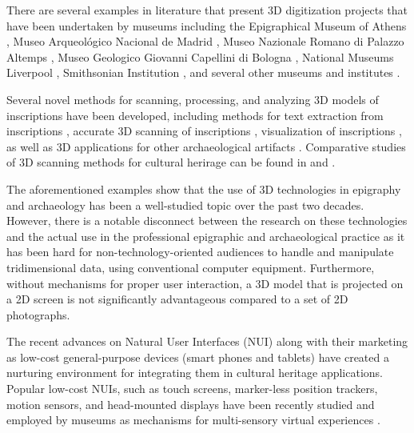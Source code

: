\documentclass[amsthm,ebook]{saparticle}
\begin{document}
There are several examples in literature that present 3D digitization projects that have been undertaken by museums
including the Epigraphical Museum of Athens \citep{sullivan_analytical_2011, papadaki_accurate_2015}, Museo Arqueológico Nacional de
Madrid \citep{ramirez-sanchez_epigrafidigital:_2014}, Museo Nazionale Romano di Palazzo Altemps \citep{barmpoutis_interactive_2015}, Museo
Geologico Giovanni Capellini di Bologna \citep{abate_valorizzazione_2014}, National Museums Liverpool \citep{cooper_chiswick_2007},
Smithsonian Institution \citep{wachowiak_3d_2009}, and several other museums and institutes \citep{barsanti_3d_2013, landon_petroglyph_2006, levoy_digital_2000}.

Several novel methods for scanning, processing, and analyzing 3D models of inscriptions have been developed, including
methods for text extraction from inscriptions \citep{aswatha_method_2014, sullivan_analytical_2011}, accurate 3D scanning of
inscriptions \citep{papadaki_accurate_2015}, visualization of inscriptions \citep{bozia_open-access_2014}, as well as 3D applications for
other archaeological artifacts \citep{babeu__2011, pollefeys_image-based_2001, malzbender_polynomial_2001, esteban_silhouette_2004}.
Comparative studies of 3D scanning methods for cultural herirage can be found in \citep{pavlidis_methods_2007} and \citep{bohler_3d_2004}. 

The aforementioned examples show that the use of 3D technologies in epigraphy and archaeology has been a
well-studied topic over the past two decades. However, there is a notable disconnect between the research on these
technologies and the actual use in the professional epigraphic and archaeological practice as it has been hard for
non-technology-oriented audiences to handle and manipulate tridimensional data, using conventional computer equipment.
Furthermore, without mechanisms for proper user interaction, a 3D model that is projected on a 2D screen is not
significantly advantageous compared to a set of 2D photographs. 

The recent advances on Natural User Interfaces (NUI) along with their marketing as low-cost general-purpose devices
(smart phones and tablets) have created a nurturing environment for integrating them in cultural heritage applications.
Popular low-cost NUIs, such as touch screens, marker-less position trackers, motion sensors, and head-mounted displays
have been recently studied and employed by museums as mechanisms for multi-sensory virtual experiences \citep{ujitoko_application_2015, soile_accurate_2013, ikei_experience_2015}.
\end{document}
